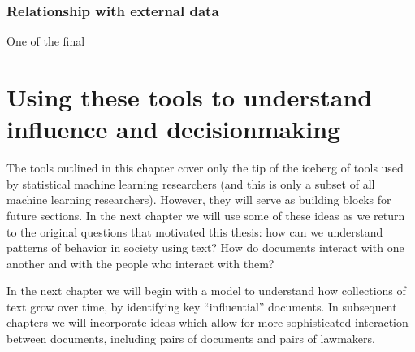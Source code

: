 \subsubsection{Relationship with external data}
One of the final 

\section{Using these tools to understand influence and decisionmaking}

The tools outlined in this chapter cover only the tip of the iceberg
of tools used by statistical machine learning researchers (and this is
only a subset of all machine learning researchers).  However, they
will serve as building blocks for future sections.  In the next
chapter we will use some of these ideas as we return to the original
questions that motivated this thesis: how can we understand patterns
of behavior in society using text?  How do documents interact with one
another and with the people who interact with them?

In the next chapter we will begin with a model to understand how
collections of text grow over time, by identifying key ``influential''
documents. In subsequent chapters we will incorporate ideas which
allow for more sophisticated interaction between documents, including
pairs of documents and pairs of lawmakers.
